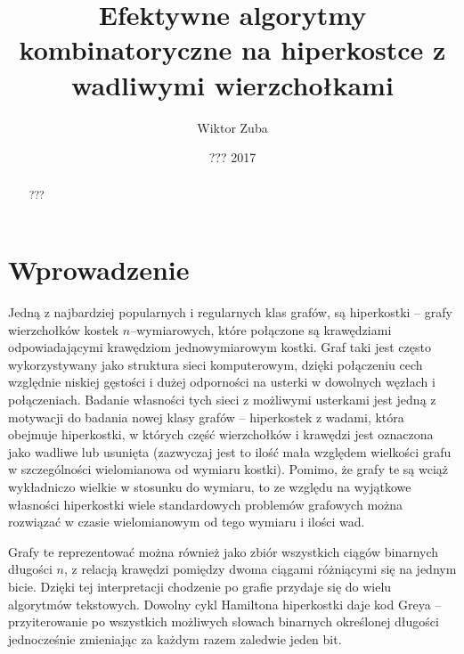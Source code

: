 \documentclass{pracamgr}
\author{Wiktor Zuba}
\title{Efektywne algorytmy kombinatoryczne na hiperkostce z wadliwymi wierzchołkami}
\date{??? 2017}
\begin{document}
\maketitle

\begin{abstract}
???
\end{abstract}


\tableofcontents%





 \chapter*{Wprowadzenie}
  Jedną z najbardziej popularnych i regularnych klas grafów, są hiperkostki -- grafy wierzchołków kostek $n$--wymiarowych,
  które połączone są krawędziami odpowiadającymi krawędziom jednowymiarowym kostki.
  Graf taki jest często wykorzystywany jako struktura sieci komputerowym, dzięki połączeniu cech względnie niskiej gęstości i dużej odporności na usterki
  w dowolnych węzłach i połączeniach.
  Badanie własności tych sieci z możliwymi usterkami jest jedną z motywacji do badania nowej klasy grafów -- hiperkostek z wadami, która obejmuje
  hiperkostki, w których część wierzchołków i krawędzi jest oznaczona jako wadliwe lub usunięta
  (zazwyczaj jest to ilość mała względem wielkości grafu w szczególności wielomianowa od wymiaru kostki).  
  Pomimo, że grafy te są wciąż wykładniczo wielkie w stosunku do wymiaru, to ze względu na wyjątkowe własności hiperkostki wiele standardowych
  problemów grafowych można rozwiązać w czasie wielomianowym od tego wymiaru i ilości wad.
  
  Grafy te reprezentować można również jako zbiór wszystkich ciągów binarnych długości $n$,
  z relacją krawędzi pomiędzy dwoma ciągami różniącymi się na jednym bicie.
  Dzięki tej interpretacji chodzenie po grafie przydaje się do wielu algorytmów tekstowych. Dowolny cykl Hamiltona hiperkostki
  daje kod Greya -- przyiterowanie po wszystkich możliwych słowach binarnych określonej długości jednocześnie zmieniając za każdym razem zaledwie jeden
  bit.\newline
  
\end{document}
